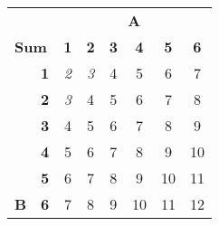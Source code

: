 \documentclass[convert]{standalone}
\begin{document}
    
\begin{tabular}{|cc|cccccc|}
\hline
\multicolumn{2}{|l|}{}                                          & \multicolumn{6}{c|}{\textbf{A}}                                                                                                                                                                                                                                             \\ \cline{3-8} 
\multicolumn{2}{|l|}{\multirow{-2}{*}{\textbf{Sum}}}            & \multicolumn{1}{c|}{\textbf{1}}               & \multicolumn{1}{c|}{\textbf{2}}               & \multicolumn{1}{c|}{\textbf{3}}               & \multicolumn{1}{c|}{\textbf{4}}                & \multicolumn{1}{c|}{\textbf{5}}                & \textbf{6}                \\ \hline
\multicolumn{1}{|c|}{}                             & \textbf{1} & \multicolumn{1}{c|}{\textit{2}}               & \multicolumn{1}{c|}{\textit{3}}               & \multicolumn{1}{c|}{{\color{blue} 4}} & \multicolumn{1}{c|}{{\color{blue} 5}}  & \multicolumn{1}{c|}{{\color{blue} 6}}  & {\color{blue} 7}  \\ \cline{2-8} 
\multicolumn{1}{|c|}{}                             & \textbf{2} & \multicolumn{1}{c|}{\textit{3}}               & \multicolumn{1}{c|}{{\color{blue} 4}} & \multicolumn{1}{c|}{{\color{blue} 5}} & \multicolumn{1}{c|}{{\color{blue} 6}}  & \multicolumn{1}{c|}{{\color{blue} 7}}  & {\color{blue} 8}  \\ \cline{2-8} 
\multicolumn{1}{|c|}{}                             & \textbf{3} & \multicolumn{1}{c|}{{\color{blue} 4}} & \multicolumn{1}{c|}{{\color{blue} 5}} & \multicolumn{1}{c|}{{\color{blue} 6}} & \multicolumn{1}{c|}{{\color{blue} 7}}  & \multicolumn{1}{c|}{{\color{blue} 8}}  & {\color{blue} 9}  \\ \cline{2-8} 
\multicolumn{1}{|c|}{}                             & \textbf{4} & \multicolumn{1}{c|}{{\color{blue} 5}} & \multicolumn{1}{c|}{{\color{blue} 6}} & \multicolumn{1}{c|}{{\color{blue} 7}} & \multicolumn{1}{c|}{{\color{blue} 8}}  & \multicolumn{1}{c|}{{\color{blue} 9}}  & {\color{blue} 10} \\ \cline{2-8} 
\multicolumn{1}{|c|}{}                             & \textbf{5} & \multicolumn{1}{c|}{{\color{blue} 6}} & \multicolumn{1}{c|}{{\color{blue} 7}} & \multicolumn{1}{c|}{{\color{blue} 8}} & \multicolumn{1}{c|}{{\color{blue} 9}}  & \multicolumn{1}{c|}{{\color{blue} 10}} & {\color{blue} 11} \\ \cline{2-8} 
\multicolumn{1}{|c|}{\multirow{-6}{*}{\textbf{B}}} & \textbf{6} & \multicolumn{1}{c|}{{\color{blue} 7}} & \multicolumn{1}{c|}{{\color{blue} 8}} & \multicolumn{1}{c|}{{\color{blue} 9}} & \multicolumn{1}{c|}{{\color{blue} 10}} & \multicolumn{1}{c|}{{\color{blue} 11}} & {\color{blue} 12} \\ \hline
\end{tabular}
\end{document}
